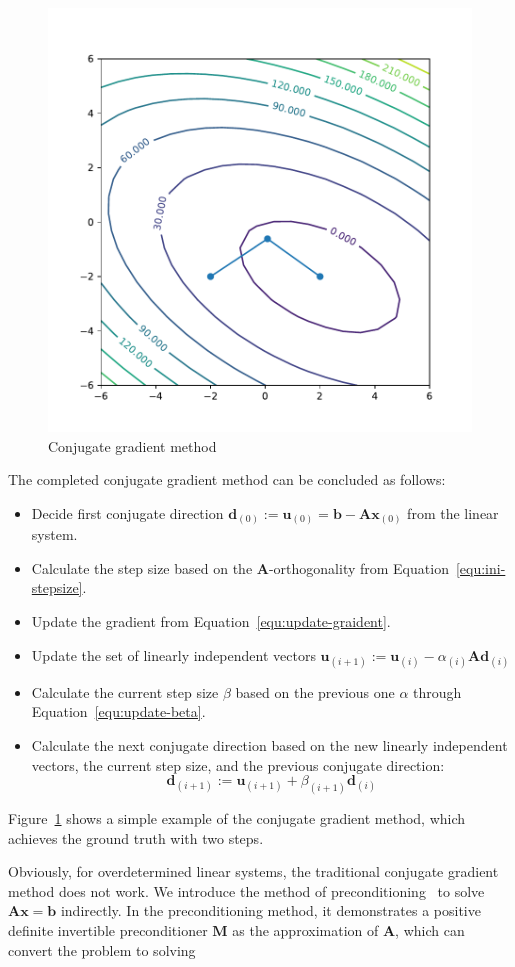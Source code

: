 \begin{figure}[t]
    \label{fig:conj-gradient}
    \centering
    \includegraphics[page=1, width=.6\textwidth]{figs/conjugate-gradient.pdf}
    \caption{Conjugate gradient method}
\end{figure}
\par The completed conjugate gradient method can be concluded as follows:
\begin{itemize}
    \item Decide first conjugate direction $\mathbf{d}_{(0)}:=\mathbf{u}_{(0)}=\mathbf{b}-\mathbf{A} \mathbf{x}_{(0)}$ from the linear system.
    \item Calculate the step size based on the $\mathbf{A}$-orthogonality from Equation~\ref{equ:ini-stepsize}.
    \item Update the gradient from Equation~\ref{equ:update-graident}.
    \item Update the set of linearly independent vectors $\mathbf{u}_{(i+1)}:=\mathbf{u}_{(i)}-\alpha_{(i)} \mathbf{A} \mathbf{d}_{(i)}$
    \item Calculate the current step size $\beta$ based on the previous one $\alpha$ through Equation~\ref{equ:update-beta}. 
    \item Calculate the next conjugate direction based on the new linearly independent vectors, the current step size, and the previous conjugate direction:
    $$
    \mathbf{d}_{(i+1)}:=\mathbf{u}_{(i+1)}+\beta_{(i+1)} \mathbf{d}_{(i)}
    $$
\end{itemize}
\par Figure~\ref{fig:conj-gradient} shows a simple example of the conjugate gradient method, which achieves the ground truth with two steps. 
\par Obviously, for overdetermined linear systems, the traditional conjugate gradient method does not work. We introduce the method of preconditioning~\cite{SJ:94} to solve $\mathbf{A}\mathbf{x}=\mathbf{b}$ indirectly. In the preconditioning method, it demonstrates a positive definite invertible preconditioner $\mathbf{M}$ as the approximation of $\mathbf{A}$, which can convert the problem to solving 
